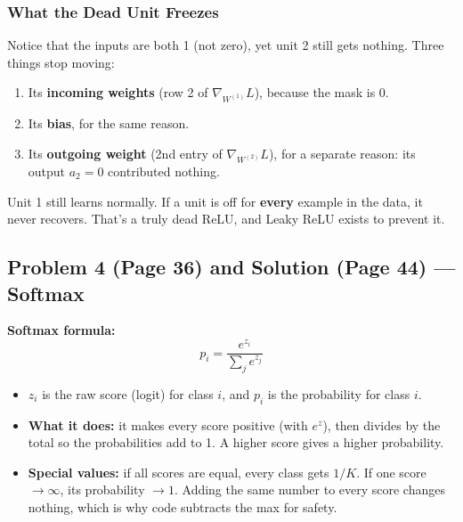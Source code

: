 \subsubsection*{What the Dead Unit Freezes}
Notice that the inputs are both 1 (not zero), yet unit 2 still gets nothing. Three things stop moving:
\begin{enumerate}[leftmargin=*]
  \item Its \textbf{incoming weights} (row 2 of $\nabla_{W^{(1)}} L$), because the mask is 0.
  \item Its \textbf{bias}, for the same reason.
  \item Its \textbf{outgoing weight} (2nd entry of $\nabla_{W^{(2)}} L$), for a separate reason: its output $a_2 = 0$ contributed nothing.
\end{enumerate}
Unit 1 still learns normally. If a unit is off for \textbf{every} example in the data, it never recovers. That's a truly dead ReLU, and Leaky ReLU exists to prevent it.

\subsection*{Problem 4 (Page 36) and Solution (Page 44) --- Softmax}

\textbf{Softmax formula:}
\[
p_i = \frac{e^{z_i}}{\sum_{j} e^{z_j}}
\]
\begin{itemize}[leftmargin=*]
  \item $z_i$ is the raw score (logit) for class $i$, and $p_i$ is the probability for class $i$.
  \item \textbf{What it does:} it makes every score positive (with $e^{z}$), then divides by the total so the probabilities add to 1. A higher score gives a higher probability.
  \item \textbf{Special values:} if all scores are equal, every class gets $1/K$. If one score $\to \infty$, its probability $\to 1$. Adding the same number to every score changes nothing, which is why code subtracts the max for safety.
\end{itemize}

